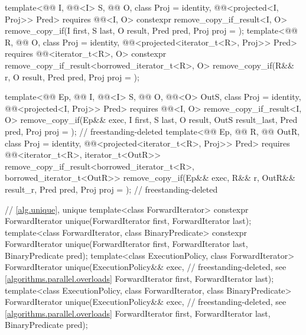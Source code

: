 \begin{codeblock}
{{    template<@@ I, @@<I> S, @@ O,
             class Proj = identity, @@<projected<I, Proj>> Pred>
      requires @@<I, O>
      constexpr remove_copy_if_result<I, O>
        remove_copy_if(I first, S last, O result, Pred pred, Proj proj = {});
    template<@@ R, @@ O, class Proj = identity,
             @@<projected<iterator_t<R>, Proj>> Pred>
      requires @@<iterator_t<R>, O>
      constexpr remove_copy_if_result<borrowed_iterator_t<R>, O>
        remove_copy_if(R&& r, O result, Pred pred, Proj proj = {});

    template<@@ Ep, @@ I, @@<I> S,
             @@ O, @@<O> OutS,
             class Proj = identity, @@<projected<I, Proj>> Pred>
      requires @@<I, O>
      remove_copy_if_result<I, O>
        remove_copy_if(Ep&& exec, I first, S last, O result, OutS result_last, Pred pred,
                       Proj proj = {});                         // freestanding-deleted
    template<@@ Ep, @@ R, @@ OutR,
             class Proj = identity,
             @@<projected<iterator_t<R>, Proj>> Pred>
      requires @@<iterator_t<R>, iterator_t<OutR>>
      remove_copy_if_result<borrowed_iterator_t<R>, borrowed_iterator_t<OutR>>
        remove_copy_if(Ep&& exec, R&& r, OutR&& result_r, Pred pred,
                       Proj proj = {});                         // freestanding-deleted
  }

  // \ref{alg.unique}, unique
  template<class ForwardIterator>
    constexpr ForwardIterator unique(ForwardIterator first, ForwardIterator last);
  template<class ForwardIterator, class BinaryPredicate>
    constexpr ForwardIterator unique(ForwardIterator first, ForwardIterator last,
                                     BinaryPredicate pred);
  template<class ExecutionPolicy, class ForwardIterator>
    ForwardIterator unique(ExecutionPolicy&& exec,              // freestanding-deleted, see \ref{algorithms.parallel.overloads}
                           ForwardIterator first, ForwardIterator last);
  template<class ExecutionPolicy, class ForwardIterator, class BinaryPredicate>
    ForwardIterator unique(ExecutionPolicy&& exec,              // freestanding-deleted, see \ref{algorithms.parallel.overloads}
                           ForwardIterator first, ForwardIterator last,
                           BinaryPredicate pred);

}
\end{codeblock}
